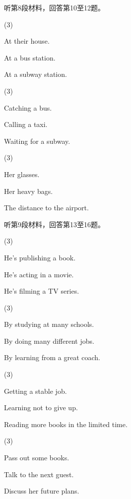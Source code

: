 \documentclass{英语试卷}
\begin{document}
\par 听第8段材料，回答第10至12题。\par
{}
\begin{choices}(3)
  \item At their house.
  \item At a bus station.
  \item At a subway station.
\end{choices}
\begin{choices}(3)
  \item Catching a bus.
  \item Calling a taxi.
  \item Waiting for a subway.
\end{choices}
\begin{choices}(3)
  \item Her glasses.
  \item Her heavy bags.
  \item The distance to the airport.
\end{choices}
\par 听第9段材料，回答第13至16题。\par
{}
\begin{choices}(3)
  \item He's publishing a book.
  \item He's acting in a movie.
  \item He's filming a TV series.
\end{choices}
\begin{choices}(3)
  \item By studying at many schools.
  \item By doing many different jobs.
  \item By learning from a great coach.
\end{choices}
\begin{choices}(3)
  \item Getting a stable job.
  \item Learning not to give up.
  \item Reading more books in the limited time.
\end{choices}
\begin{choices}(3)
  \item Pass out some books.
  \item Talk to the next guest.
  \item Discuss her future plans.
\end{choices}
\end{document}
